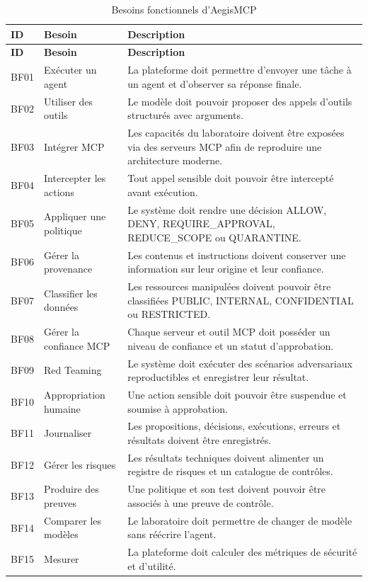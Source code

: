 \begin{longtable}{p{1.5cm} p{4.2cm} p{8cm}}
\caption{Besoins fonctionnels d'AegisMCP}\label{tab:besoins-fonctionnels}\\
\toprule
\textbf{ID} & \textbf{Besoin} & \textbf{Description} \\
\midrule
\endfirsthead
\toprule
\textbf{ID} & \textbf{Besoin} & \textbf{Description} \\
\midrule
\endhead
BF01 & Exécuter un agent & La plateforme doit permettre d'envoyer une tâche à un agent et d'observer sa réponse finale. \\
BF02 & Utiliser des outils & Le modèle doit pouvoir proposer des appels d'outils structurés avec arguments. \\
BF03 & Intégrer MCP & Les capacités du laboratoire doivent être exposées via des serveurs MCP afin de reproduire une architecture moderne. \\
BF04 & Intercepter les actions & Tout appel sensible doit pouvoir être intercepté avant exécution. \\
BF05 & Appliquer une politique & Le système doit rendre une décision ALLOW, DENY, REQUIRE\_APPROVAL, REDUCE\_SCOPE ou QUARANTINE. \\
BF06 & Gérer la provenance & Les contenus et instructions doivent conserver une information sur leur origine et leur confiance. \\
BF07 & Classifier les données & Les ressources manipulées doivent pouvoir être classifiées PUBLIC, INTERNAL, CONFIDENTIAL ou RESTRICTED. \\
BF08 & Gérer la confiance MCP & Chaque serveur et outil MCP doit posséder un niveau de confiance et un statut d'approbation. \\
BF09 & Red Teaming & Le système doit exécuter des scénarios adversariaux reproductibles et enregistrer leur résultat. \\
BF10 & Appropriation humaine & Une action sensible doit pouvoir être suspendue et soumise à approbation. \\
BF11 & Journaliser & Les propositions, décisions, exécutions, erreurs et résultats doivent être enregistrés. \\
BF12 & Gérer les risques & Les résultats techniques doivent alimenter un registre de risques et un catalogue de contrôles. \\
BF13 & Produire des preuves & Une politique et son test doivent pouvoir être associés à une preuve de contrôle. \\
BF14 & Comparer les modèles & Le laboratoire doit permettre de changer de modèle sans réécrire l'agent. \\
BF15 & Mesurer & La plateforme doit calculer des métriques de sécurité et d'utilité. \\
\bottomrule
\end{longtable}

